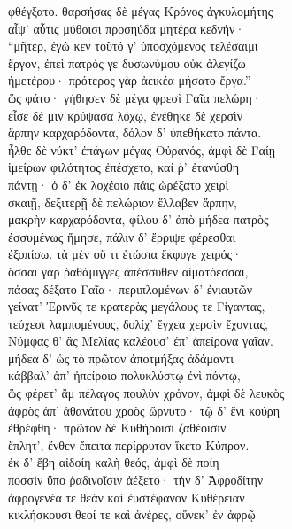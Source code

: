 \begin{pages}
\begin{Leftside}
\quad{}φθέγξατο. θαρσήσας δὲ μέγας Κρόνος ἀγκυλομήτης\\
αἶψ' αὖτις μύθοισι προσηύδα μητέρα κεδνήν·\\
``μῆτερ, ἐγώ κεν τοῦτό γ' ὑποσχόμενος τελέσαιμι  \\
ἔργον, ἐπεὶ πατρός γε δυσωνύμου οὐκ ἀλεγίζω\\
ἡμετέρου· πρότερος γὰρ ἀεικέα μήσατο ἔργα.''\\

\quad{}ὣς φάτο· γήθησεν δὲ μέγα φρεσὶ Γαῖα πελώρη· \\
εἷσε δέ μιν κρύψασα λόχῳ, ἐνέθηκε δὲ χερσὶν \\
ἅρπην καρχαρόδοντα, δόλον δ' ὑπεθήκατο πάντα.  \\
ἦλθε δὲ νύκτ' ἐπάγων μέγας Οὐρανός, ἀμφὶ δὲ Γαίῃ\\
ἱμείρων φιλότητος ἐπέσχετο, καί ῥ' ἐτανύσθη\\
πάντῃ· ὁ δ' ἐκ λοχέοιο πάις ὠρέξατο χειρὶ\\
σκαιῇ, δεξιτερῇ δὲ πελώριον ἔλλαβεν ἅρπην,\\
μακρὴν καρχαρόδοντα, φίλου δ' ἀπὸ μήδεα πατρὸς \\
ἐσσυμένως ἤμησε, πάλιν δ' ἔρριψε φέρεσθαι\\
ἐξοπίσω. τὰ μὲν οὔ τι ἐτώσια ἔκφυγε χειρός· \\
ὅσσαι γὰρ ῥαθάμιγγες ἀπέσσυθεν αἱματόεσσαι,\\
πάσας δέξατο Γαῖα· περιπλομένων δ' ἐνιαυτῶν \\
γείνατ' Ἐρινῦς τε κρατερὰς μεγάλους τε Γίγαντας, \\
τεύχεσι λαμπομένους, δολίχ' ἔγχεα χερσὶν ἔχοντας,\\
Νύμφας θ' ἃς Μελίας καλέουσ' ἐπ' ἀπείρονα γαῖαν. \\
μήδεα δ' ὡς τὸ πρῶτον ἀποτμήξας ἀδάμαντι\\
κάββαλ' ἀπ' ἠπείροιο πολυκλύστῳ ἐνὶ πόντῳ,\\
ὣς φέρετ' ἂμ πέλαγος πουλὺν χρόνον, ἀμφὶ δὲ λευκὸς \\
ἀφρὸς ἀπ' ἀθανάτου χροὸς ὤρνυτο· τῷ δ' ἔνι κούρη \\
ἐθρέφθη· πρῶτον δὲ Κυθήροισι ζαθέοισιν \\
ἔπλητ', ἔνθεν ἔπειτα περίρρυτον ἵκετο Κύπρον.\\
ἐκ δ' ἔβη αἰδοίη καλὴ θεός, ἀμφὶ δὲ ποίη\\
ποσσὶν ὕπο ῥαδινοῖσιν ἀέξετο· τὴν δ' Ἀφροδίτην  \\
ἀφρογενέα τε θεὰν καὶ ἐυστέφανον Κυθέρειαν\\
κικλήσκουσι θεοί τε καὶ ἀνέρες, οὕνεκ' ἐν ἀφρῷ\\

\end{Leftside}
\end{pages}
